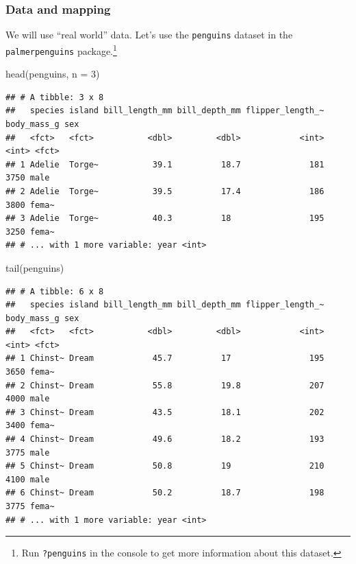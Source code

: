 \documentclass[
]{article}
\newenvironment{Shaded}{\begin{snugshade}}{\end{snugshade}}
\newcommand{\AttributeTok}[1]{\textcolor[rgb]{0.77,0.63,0.00}{#1}}
\newcommand{\DecValTok}[1]{\textcolor[rgb]{0.00,0.00,0.81}{#1}}
\newcommand{\FunctionTok}[1]{\textcolor[rgb]{0.00,0.00,0.00}{#1}}
\newcommand{\NormalTok}[1]{#1}
\begin{document}
\hypertarget{data-and-mapping}{%
\subsubsection{Data and mapping}\label{data-and-mapping}}

We will use ``real world'' data. Let's use the \texttt{penguins} dataset
in the \texttt{palmerpenguins} package.\footnote{Run \texttt{?penguins}
  in the console to get more information about this dataset.}

\begin{Shaded}
\begin{Highlighting}[]
\FunctionTok{head}\NormalTok{(penguins, }\AttributeTok{n =} \DecValTok{3}\NormalTok{)}
\end{Highlighting}
\end{Shaded}

\begin{verbatim}
## # A tibble: 3 x 8
##   species island bill_length_mm bill_depth_mm flipper_length_~ body_mass_g sex  
##   <fct>   <fct>           <dbl>         <dbl>            <int>       <int> <fct>
## 1 Adelie  Torge~           39.1          18.7              181        3750 male 
## 2 Adelie  Torge~           39.5          17.4              186        3800 fema~
## 3 Adelie  Torge~           40.3          18                195        3250 fema~
## # ... with 1 more variable: year <int>
\end{verbatim}

\begin{Shaded}
\begin{Highlighting}[]
\FunctionTok{tail}\NormalTok{(penguins)}
\end{Highlighting}
\end{Shaded}

\begin{verbatim}
## # A tibble: 6 x 8
##   species island bill_length_mm bill_depth_mm flipper_length_~ body_mass_g sex  
##   <fct>   <fct>           <dbl>         <dbl>            <int>       <int> <fct>
## 1 Chinst~ Dream            45.7          17                195        3650 fema~
## 2 Chinst~ Dream            55.8          19.8              207        4000 male 
## 3 Chinst~ Dream            43.5          18.1              202        3400 fema~
## 4 Chinst~ Dream            49.6          18.2              193        3775 male 
## 5 Chinst~ Dream            50.8          19                210        4100 male 
## 6 Chinst~ Dream            50.2          18.7              198        3775 fema~
## # ... with 1 more variable: year <int>
\end{verbatim}
\end{document}
